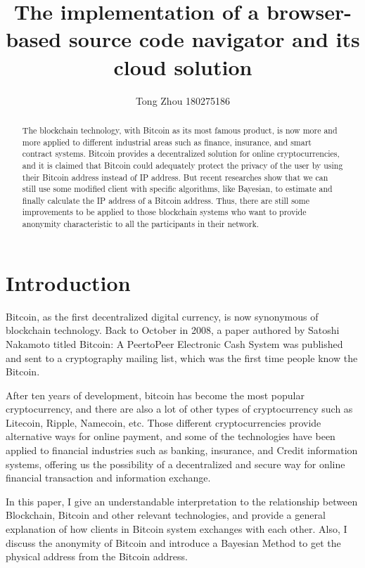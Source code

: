 \documentclass[runningheads]{llncs}
\title{The implementation of a browser-based source code navigator and its cloud solution} %
\author{Tong Zhou 180275186}
\institute{School of Computing, Newcastle University \\ Newcastle upon Tyne, NE1 7RU}
\begin{document}
\maketitle

\begin{abstract}
	The blockchain technology, with Bitcoin as its most famous product, is now more and more applied to different industrial areas such as finance, insurance, and smart contract systems. Bitcoin provides a decentralized solution for online cryptocurrencies, and it is claimed that Bitcoin could adequately protect the privacy of the user by using their Bitcoin address instead of IP address\cite{nakamoto2008bitcoin}. But recent researches show that we can still use some modified client with specific algorithms, like Bayesian\cite{juhasz2018bayesian}, to estimate and finally calculate the IP address of a Bitcoin address. Thus, there are still some improvements to be applied to those blockchain systems who want to provide anonymity characteristic to all the participants in their network.
\end{abstract}
\section{Introduction}

Bitcoin, as the first decentralized digital currency, is now synonymous of blockchain technology. Back to October in 2008, a paper authored by Satoshi Nakamoto titled Bitcoin: A PeertoPeer Electronic Cash System\cite{nakamoto2008bitcoin} was published and sent to a cryptography mailing list, which was the first time people know the Bitcoin.

After ten years of development, bitcoin has become the most popular cryptocurrency, and there are also a lot of other types of cryptocurrency such as Litecoin, Ripple, Namecoin, etc. Those different cryptocurrencies provide alternative ways for online payment, and some of the technologies have been applied to financial industries such as banking, insurance, and Credit information systems, offering us the possibility of a decentralized and secure way for online financial transaction and information exchange.

In this paper, I give an understandable interpretation to the relationship between Blockchain, Bitcoin and other relevant technologies, and provide a general explanation of how clients in Bitcoin system exchanges with each other. Also, I discuss the anonymity of Bitcoin and introduce a Bayesian Method to get the physical address from the Bitcoin address.
\end{document}
